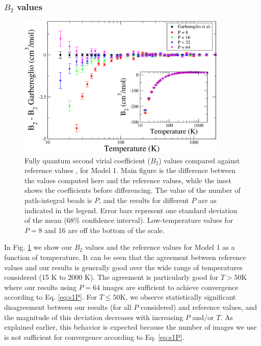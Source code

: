             \subsubsection{$B_2$ values}
                \begin{figure}[!htbp]
                    \centering
                    \includegraphics[width=10cm,keepaspectratio]{Chapter-4/Figures/s1GarberoglioAll.png}
                    \caption{Fully quantum second virial coefficient ($B_2$) values compared against reference values \cite{Garberoglio2014}, for Model 1. Main figure is the difference between the values computed here and the reference values, while the inset shows the coefficients before differencing. The value of the number of path-integral beads is $P$, and the results for different $P$ are as indicated in the legend. Error bars represent one standard deviation of the mean (68\% confidence interval). Low-temperature values for $P = 8$ and 16 are off the bottom of the scale.}
                    \label{fig:r0}
                \end{figure}
                In Fig. \ref{fig:r0} we show our $B_2$ values and the reference values for Model 1 as a function of temperature. It can be seen that the agreement between reference values and our results is generally good over the wide range of temperatures considered (15 K to 2000 K). The agreement is particularly good for $T > 50 $K where our results using $P = 64$ images are sufficient to achieve convergence according to Eq. \eqref{eq:s1P}. For $T \le 50 $K, we observe statistically significant disagreement between our results (for all $P$ considered) and reference values, and the magnitude of this deviation decreases with increasing $P$ and/or $T$. As explained earlier, this behavior is expected because the number of images we use is not sufficient for convergence according to Eq. \eqref{eq:s1P}.

